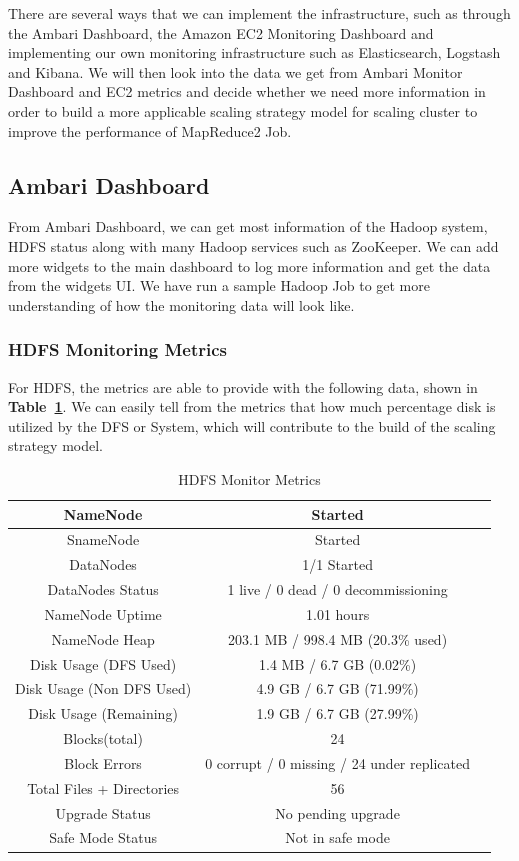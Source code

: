\documentclass{article}
\begin{document}
There are several ways that we can implement the infrastructure, such as through the Ambari Dashboard, the Amazon EC2 Monitoring Dashboard and implementing our own monitoring infrastructure such as Elasticsearch, Logstash and Kibana. We will then look into the data we get from Ambari Monitor Dashboard and EC2 metrics and decide whether we need more information in order to build a more applicable scaling strategy model for scaling cluster to improve the performance of MapReduce2 Job.
\subsection{Ambari Dashboard}
From Ambari Dashboard, we can get most information of the Hadoop system, HDFS status along with many Hadoop services such as ZooKeeper. We can add more widgets to the main dashboard to log more information and get the data from the widgets UI. We have run a sample Hadoop Job to get more understanding of how the monitoring data will look like.
\subsubsection{HDFS Monitoring Metrics}
For HDFS, the metrics are able to provide with the following data, shown in \textbf{Table~\ref{table:hdfsMetrics}}. We can easily tell from the metrics that how much percentage disk is utilized by the DFS or System, which will contribute to the build of the scaling strategy model.
\begin{table}[ht!]
\begin{center}
\begin{tabular}{ |c|c|c| }
\hline
NameNode & Started \\
\hline
SnameNode & Started \\
\hline
DataNodes & 1/1 Started \\
\hline
DataNodes Status & 1 live / 0 dead / 0 decommissioning \\
\hline
NameNode Uptime & 1.01 hours\\
\hline
NameNode Heap & 203.1 MB / 998.4 MB (20.3\% used)\\
\hline
Disk Usage (DFS Used) & 1.4 MB / 6.7 GB (0.02\%)\\
\hline
Disk Usage (Non DFS Used) & 4.9 GB / 6.7 GB (71.99\%)\\
\hline
Disk Usage (Remaining) & 1.9 GB / 6.7 GB (27.99\%)\\
\hline
Blocks(total) & 24\\
\hline
Block Errors & 0 corrupt / 0 missing / 24 under replicated\\
\hline
Total Files + Directories & 56 \\
\hline
Upgrade Status & No pending upgrade\\
\hline
Safe Mode Status & Not in safe mode\\
\hline


\end{tabular}
\end{center}
\caption{HDFS Monitor Metrics}
\label{table:hdfsMetrics}
\end{table}
\end{document}
